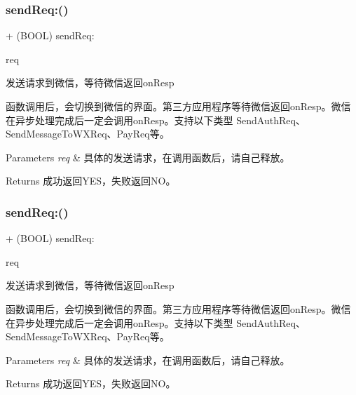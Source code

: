\subsubsection{\texorpdfstring{send\+Req\+:()}{sendReq:()}\hspace{0.1cm}{\footnotesize\ttfamily [2/3]}}
{\footnotesize\ttfamily + (B\+O\+OL) send\+Req\+: \begin{DoxyParamCaption}\item[{(\mbox{\hyperlink{interface_base_req}{Base\+Req}} $\ast$)}]{req }\end{DoxyParamCaption}}



发送请求到微信，等待微信返回on\+Resp 

函数调用后，会切换到微信的界面。第三方应用程序等待微信返回on\+Resp。微信在异步处理完成后一定会调用on\+Resp。支持以下类型 Send\+Auth\+Req、\+Send\+Message\+To\+W\+X\+Req、\+Pay\+Req等。 
\begin{DoxyParams}{Parameters}
{\em req} & 具体的发送请求，在调用函数后，请自己释放。 \\
\hline
\end{DoxyParams}
\begin{DoxyReturn}{Returns}
成功返回\+Y\+E\+S，失败返回\+N\+O。 
\end{DoxyReturn}
\mbox{\label{interface_w_x_api_a1a30bc4f39815920b6e45901375bee8e}} 
\subsubsection{\texorpdfstring{send\+Req\+:()}{sendReq:()}\hspace{0.1cm}{\footnotesize\ttfamily [3/3]}}
{\footnotesize\ttfamily + (B\+O\+OL) send\+Req\+: \begin{DoxyParamCaption}\item[{(\mbox{\hyperlink{interface_base_req}{Base\+Req}} $\ast$)}]{req }\end{DoxyParamCaption}}



发送请求到微信，等待微信返回on\+Resp 

函数调用后，会切换到微信的界面。第三方应用程序等待微信返回on\+Resp。微信在异步处理完成后一定会调用on\+Resp。支持以下类型 Send\+Auth\+Req、\+Send\+Message\+To\+W\+X\+Req、\+Pay\+Req等。 
\begin{DoxyParams}{Parameters}
{\em req} & 具体的发送请求，在调用函数后，请自己释放。 \\
\hline
\end{DoxyParams}
\begin{DoxyReturn}{Returns}
成功返回\+Y\+E\+S，失败返回\+N\+O。 
\end{DoxyReturn}
\mbox{\label{interface_w_x_api_ab026294e5601cd15d7b792c3de7b81d5}} 
